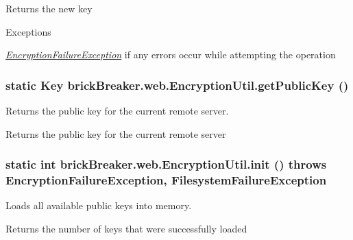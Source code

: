 \begin{DoxyReturn}{Returns}
the new key
\end{DoxyReturn}

\begin{DoxyExceptions}{Exceptions}
\item[{\em \hyperlink{classbrick_breaker_1_1web_1_1_encryption_failure_exception}{EncryptionFailureException}}]if any errors occur while attempting the operation \end{DoxyExceptions}
\hypertarget{classbrick_breaker_1_1web_1_1_encryption_util_ac1c5c210199ba00750b5dd06845cb784}{
\subsubsection[{getPublicKey}]{\setlength{\rightskip}{0pt plus 5cm}static Key brickBreaker.web.EncryptionUtil.getPublicKey ()}}
\label{classbrick_breaker_1_1web_1_1_encryption_util_ac1c5c210199ba00750b5dd06845cb784}
Returns the public key for the current remote server.

\begin{DoxyReturn}{Returns}
the public key for the current remote server 
\end{DoxyReturn}
\hypertarget{classbrick_breaker_1_1web_1_1_encryption_util_a3504c386ef5a1beb2410a140fa641b1f}{
\subsubsection[{init}]{\setlength{\rightskip}{0pt plus 5cm}static int brickBreaker.web.EncryptionUtil.init ()  throws {\bf EncryptionFailureException}, 			{\bf FilesystemFailureException} }}
\label{classbrick_breaker_1_1web_1_1_encryption_util_a3504c386ef5a1beb2410a140fa641b1f}
Loads all available public keys into memory.

\begin{DoxyReturn}{Returns}
the number of keys that were successfully loaded
\end{DoxyReturn}

